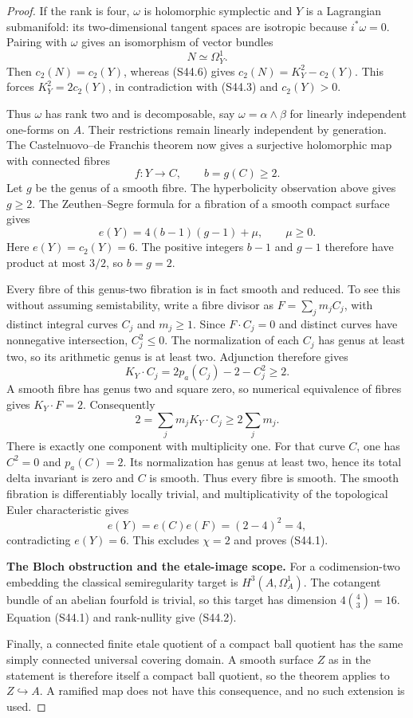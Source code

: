\begin{proof}
If the rank is four, $\omega$ is holomorphic symplectic and $Y$ is a
Lagrangian submanifold: its two-dimensional tangent spaces are
isotropic because $i^*\omega=0$. Pairing with $\omega$ gives an
isomorphism of vector bundles
\[
 N\simeq\Omega_Y^1.
\]
Then $c_2(N)=c_2(Y)$, whereas (S44.6) gives
$c_2(N)=K_Y^2-c_2(Y)$. This forces $K_Y^2=2c_2(Y)$, in contradiction
with (S44.3) and $c_2(Y)>0$.

Thus $\omega$ has rank two and is decomposable, say
$\omega=\alpha\wedge\beta$ for linearly independent one-forms on
$A$. Their restrictions remain linearly independent by generation.
The Castelnuovo--de Franchis theorem now gives a surjective
holomorphic map with connected fibres
\[
 f:Y\longrightarrow C,\qquad b=g(C)\ge2.
 \tag{S44.10}
\]
Let $g$ be the genus of a smooth fibre. The hyperbolicity observation
above gives $g\ge2$. The Zeuthen--Segre formula for a fibration of a
smooth compact surface gives
\[
 e(Y)=4(b-1)(g-1)+\mu,\qquad \mu\ge0.
 \tag{S44.11}
\]
Here $e(Y)=c_2(Y)=6$. The positive integers $b-1$ and $g-1$
therefore have product at most $3/2$, so $b=g=2$.

Every fibre of this genus-two fibration is in fact smooth and reduced.
To see this without assuming semistability, write a fibre divisor as
$F=\sum_j m_jC_j$, with distinct integral curves $C_j$ and
$m_j\ge1$. Since $F\cdot C_j=0$ and distinct curves have
nonnegative intersection, $C_j^2\le0$. The normalization of each
$C_j$ has genus at least two, so its arithmetic genus is at least
two. Adjunction therefore gives
\[
 K_Y\cdot C_j=2p_a(C_j)-2-C_j^2\ge2.
 \tag{S44.12}
\]
A smooth fibre has genus two and square zero, so numerical equivalence
of fibres gives $K_Y\cdot F=2$. Consequently
\[
 2=\sum_jm_j K_Y\cdot C_j\ge2\sum_jm_j.
\]
There is exactly one component with multiplicity one. For that curve
$C$, one has $C^2=0$ and $p_a(C)=2$. Its normalization has genus at
least two, hence its total delta invariant is zero and $C$ is smooth.
Thus every fibre is smooth. The smooth fibration is differentiably
locally trivial, and multiplicativity of the topological Euler
characteristic gives
\[
 e(Y)=e(C)e(F)=(2-4)^2=4,
\]
contradicting $e(Y)=6$. This excludes $\chi=2$ and proves (S44.1).

\noindent\textbf{The Bloch obstruction and the etale-image scope.}
For a codimension-two embedding the classical semiregularity target
is $H^3(A,\Omega_A^1)$. The cotangent bundle of an abelian fourfold
is trivial, so this target has dimension
$4\binom43=16$. Equation (S44.1) and rank-nullity give (S44.2).

Finally, a connected finite etale quotient of a compact ball quotient
has the same simply connected universal covering domain. A smooth
surface $Z$ as in the statement is therefore itself a compact ball
quotient, so the theorem applies to $Z\hookrightarrow A$. A ramified
map does not have this consequence, and no such extension is used.
\end{proof}

